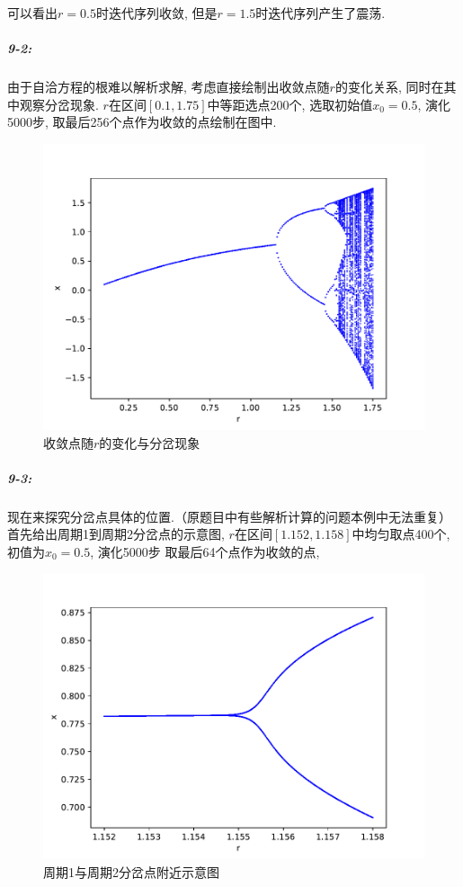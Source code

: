 \documentclass[a4paper,zihao=5,UTF8]{ctexart}
\begin{document}
    可以看出$r=0.5$时迭代序列收敛, 但是$r=1.5$时迭代序列产生了震荡.
    \subparagraph{9-2:}
    由于自洽方程的根难以解析求解, 考虑直接绘制出收敛点随$r$的变化关系, 同时在其中观察分岔现象.
    $r$在区间$[0.1, 1.75]$中等距选点200个, 选取初始值$x_0=0.5$, 演化5000步, 取最后256个点作为收敛的点绘制在图中. 
    \begin{figure}[htbp]
        \centering
        \includegraphics[scale=0.5]{9_2.pdf}
        \caption{收敛点随$r$的变化与分岔现象}
    \end{figure}
    \subparagraph{9-3:}
    现在来探究分岔点具体的位置.（原题目中有些解析计算的问题本例中无法重复）
    首先给出周期1到周期2分岔点的示意图, $r$在区间$[1.152,1.158]$中均匀取点400个, 初值为$x_0 = 0.5$, 演化5000步
    取最后64个点作为收敛的点,
    \begin{figure}[htbp]
        \centering
        \includegraphics[scale=0.5]{9_3_1.pdf}
        \caption{周期1与周期2分岔点附近示意图}
    \end{figure}
\end{document}

